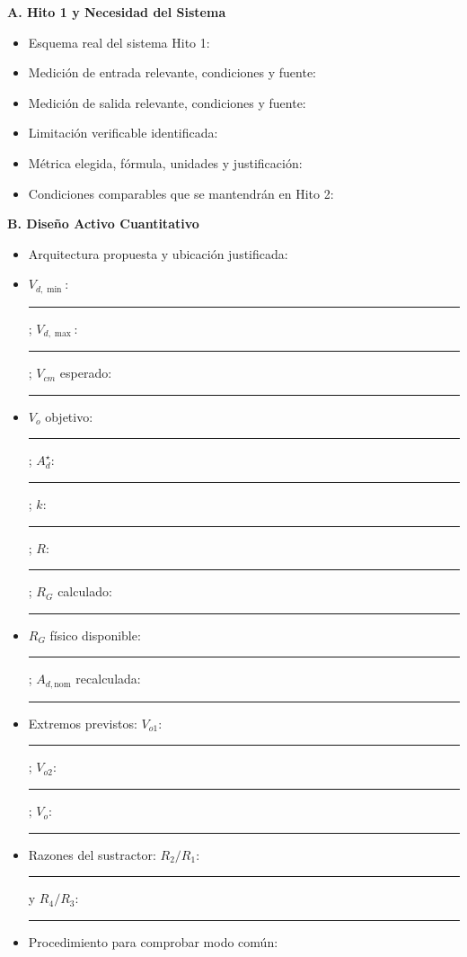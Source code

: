 \documentclass[10pt, a4paper]{article}
\begin{document}
\begin{tcolorbox}[colback=white, colframe=ucbblue, title=\textbf{Formulario de Defensa Documental — Gate A (Hito 2)}]
    \small
    \textbf{A. Hito 1 y Necesidad del Sistema}
    \begin{itemize}
        \setlength{\itemsep}{3pt}
        \item Esquema real del sistema Hito 1: \hrulefill
        \item Medición de entrada relevante, condiciones y fuente: \hrulefill
        \item Medición de salida relevante, condiciones y fuente: \hrulefill
        \item Limitación verificable identificada: \hrulefill
        \item Métrica elegida, fórmula, unidades y justificación: \hrulefill
        \item Condiciones comparables que se mantendrán en Hito 2: \hrulefill
    \end{itemize}

    \textbf{B. Diseño Activo Cuantitativo}
    \begin{itemize}
        \setlength{\itemsep}{3pt}
        \item Arquitectura propuesta y ubicación justificada: \hrulefill
        \item $V_{d,\min}$: \rule{2.2cm}{0.4pt} ; \quad $V_{d,\max}$: \rule{2.2cm}{0.4pt} ; \quad $V_{cm}$ esperado: \rule{2.2cm}{0.4pt}
        \item $V_o$ objetivo: \rule{2.2cm}{0.4pt} ; \quad $A_d^\star$: \rule{2.0cm}{0.4pt} ; \quad $k$: \rule{1.5cm}{0.4pt} ; \quad $R$: \rule{2.0cm}{0.4pt} ; \quad $R_G$ calculado: \rule{2.2cm}{0.4pt}
        \item $R_G$ físico disponible: \rule{2.2cm}{0.4pt} ; \quad $A_{d,\mathrm{nom}}$ recalculada: \rule{2.2cm}{0.4pt}
        \item Extremos previstos: $V_{o1}$: \rule{2.2cm}{0.4pt} ; \quad $V_{o2}$: \rule{2.2cm}{0.4pt} ; \quad $V_o$: \rule{2.2cm}{0.4pt}
        \item Razones del sustractor: $R_2/R_1$: \rule{2.2cm}{0.4pt} \quad y \quad $R_4/R_3$: \rule{2.2cm}{0.4pt}
        \item Procedimiento para comprobar modo común: \hrulefill
    \end{itemize}


\end{tcolorbox}
\end{document}
